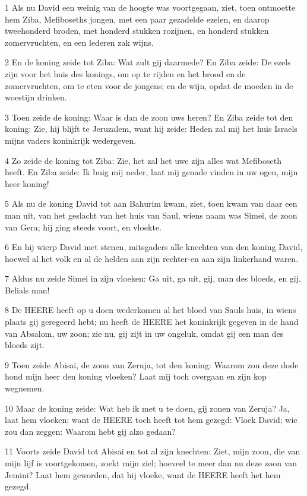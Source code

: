 \par 1 Als nu David een weinig van de hoogte was voortgegaan, ziet, toen ontmoette hem Ziba, Mefiboseths jongen, met een paar gezadelde ezelen, en daarop tweehonderd broden, met honderd stukken rozijnen, en honderd stukken zomervruchten, en een lederen zak wijns.
\par 2 En de koning zeide tot Ziba: Wat zult gij daarmede? En Ziba zeide: De ezels zijn voor het huis des konings, om op te rijden en het brood en de zomervruchten, om te eten voor de jongens; en de wijn, opdat de moeden in de woestijn drinken.
\par 3 Toen zeide de koning: Waar is dan de zoon uws heren? En Ziba zeide tot den koning: Zie, hij blijft te Jeruzalem, want hij zeide: Heden zal mij het huis Israels mijns vaders koninkrijk wedergeven.
\par 4 Zo zeide de koning tot Ziba: Zie, het zal het uwe zijn alles wat Mefiboseth heeft. En Ziba zeide: Ik buig mij neder, laat mij genade vinden in uw ogen, mijn heer koning!
\par 5 Als nu de koning David tot aan Bahurim kwam, ziet, toen kwam van daar een man uit, van het geslacht van het huis van Saul, wiens naam was Simei, de zoon van Gera; hij ging steeds voort, en vloekte.
\par 6 En hij wierp David met stenen, mitsgaders alle knechten van den koning David, hoewel al het volk en al de helden aan zijn rechter-en aan zijn linkerhand waren.
\par 7 Aldus nu zeide Simei in zijn vloeken: Ga uit, ga uit, gij, man des bloeds, en gij, Belials man!
\par 8 De HEERE heeft op u doen wederkomen al het bloed van Sauls huis, in wiens plaats gij geregeerd hebt; nu heeft de HEERE het koninkrijk gegeven in de hand van Absalom, uw zoon; zie nu, gij zijt in uw ongeluk, omdat gij een man des bloeds zijt.
\par 9 Toen zeide Abisai, de zoon van Zeruja, tot den koning: Waarom zou deze dode hond mijn heer den koning vloeken? Laat mij toch overgaan en zijn kop wegnemen.
\par 10 Maar de koning zeide: Wat heb ik met u te doen, gij zonen van Zeruja? Ja, laat hem vloeken; want de HEERE toch heeft tot hem gezegd: Vloek David; wie zou dan zeggen: Waarom hebt gij alzo gedaan?
\par 11 Voorts zeide David tot Abisai en tot al zijn knechten: Ziet, mijn zoon, die van mijn lijf is voortgekomen, zoekt mijn ziel; hoeveel te meer dan nu deze zoon van Jemini? Laat hem geworden, dat hij vloeke, want de HEERE heeft het hem gezegd.
